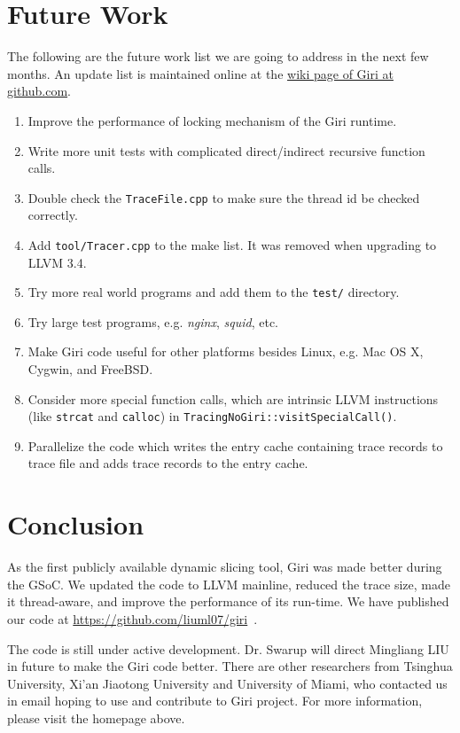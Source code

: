 \documentclass[DIV=calc, paper=a4, fontsize=11pt, twocolumn]{scrartcl}
\begin{document}
\section{Future Work}
The following are the future work list we are going to address in the next few months.
An update list is maintained online at the \href{https://github.com/liuml07/giri/wiki/TODO}{wiki page of Giri at github.com}.
\label{sec:todo}
\begin{enumerate}
	\item Improve the performance of locking mechanism of the Giri runtime.
	\item Write more unit tests with complicated direct/indirect recursive function calls.
	\item Double check the \texttt{TraceFile.cpp} to make sure the thread id be checked correctly.
	\item Add \texttt{tool/Tracer.cpp} to the make list. It was removed when upgrading to LLVM 3.4.
	\item Try more real world programs and add them to the \texttt{test/} directory.
	\item Try large test programs, e.g. \emph{nginx}, \emph{squid}, etc.
	\item Make Giri code useful for other platforms besides Linux, e.g. Mac OS X, Cygwin, and FreeBSD.
	\item Consider more special function calls, which are intrinsic LLVM instructions (like \texttt{strcat} and \texttt{calloc}) in \texttt{TracingNoGiri::visitSpecialCall()}.
	\item Parallelize the code which writes the entry cache containing trace records to trace file and adds trace records to the entry cache.
\end{enumerate}

\section{Conclusion}
\label{sec:contact}
As the first publicly available dynamic slicing tool,
Giri was made better during the GSoC. We updated the code to LLVM mainline, reduced the trace size, made it thread-aware, and improve the performance of its run-time.
We have published our code at \href{https://github.com/liuml07/giri}{https://github.com/liuml07/giri}~\cite{giri}.

The code is still under active development.
Dr. Swarup will direct Mingliang LIU in future to make the Giri code better.
There are other researchers from Tsinghua University, Xi'an Jiaotong University and University of Miami,
who contacted us in email hoping to use and contribute to Giri project.
For more information, please visit the homepage above.


 
\end{document}
